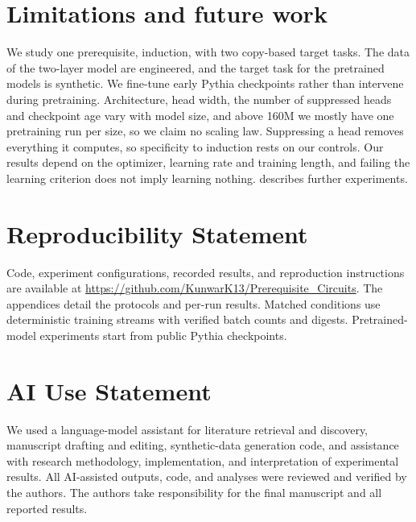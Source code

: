 \section{Limitations and future work}
\label{sec:limits}

We study one prerequisite, induction, with two copy-based target tasks. The data of
the two-layer model are engineered, and the target task for the pretrained models is
synthetic. We fine-tune early Pythia checkpoints rather than intervene during
pretraining. Architecture, head width, the number of suppressed heads and checkpoint
age vary with model size, and above 160M we mostly have one pretraining run per
size, so we claim no scaling law. Suppressing a head removes everything it computes,
so specificity to induction rests on our controls. Our results depend on the
optimizer, learning rate and training length, and failing the learning criterion
does not imply learning nothing.  describes further experiments.

\section*{Reproducibility Statement}
Code, experiment configurations, recorded results, and reproduction
instructions are available at
\url{https://github.com/KunwarK13/Prerequisite_Circuits}.
The appendices detail the protocols and per-run results. Matched conditions
use deterministic training streams with verified batch counts and digests.
Pretrained-model experiments start from public Pythia checkpoints.

\section*{AI Use Statement}
We used a language-model assistant for literature retrieval and
discovery, manuscript drafting and editing, synthetic-data generation
code, and assistance with research methodology, implementation,
and interpretation of experimental results. All AI-assisted outputs, code, and analyses were reviewed and verified by the authors. The authors take
responsibility for the final manuscript and all reported results.



\appendix

